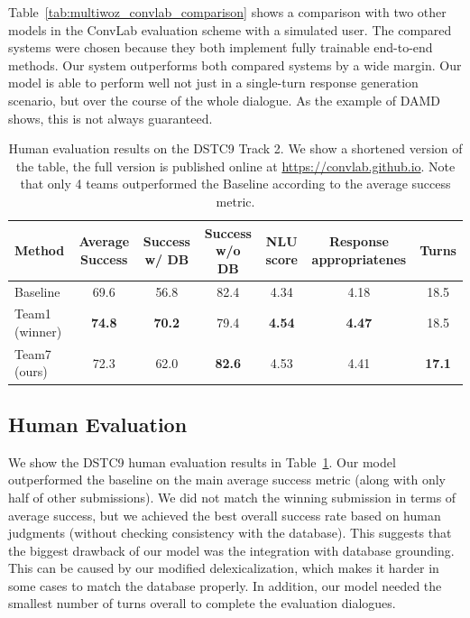 \documentclass[letterpaper]{article} %
\begin{document}
Table~\ref{tab:multiwoz_convlab_comparison} shows a comparison with two other models in the ConvLab evaluation scheme with a simulated user. The compared systems were chosen because they both implement fully trainable end-to-end methods. Our system outperforms both compared systems by a wide margin. Our model is able to perform well not just in a single-turn response generation scenario, but over the course of the whole dialogue. As the example of DAMD shows, this is not always guaranteed.

\begin{table}[ht]
    \centering
    \begin{tabular}{lcccccc}
      \toprule
      Method & Average Success & Success w/ DB & Success w/o DB & NLU score & Response appropriatenes & Turns \\
      \midrule
      Baseline & 69.6 & 56.8 & 82.4 & 4.34 & 4.18 & 18.5 \\
      Team1 (winner) & \textbf{74.8} & \textbf{70.2} & 79.4 & \textbf{4.54 }& \textbf{4.47} & 18.5 \\
      Team7 (ours) & 72.3 & 62.0 & \textbf{82.6} & 4.53 & 4.41 & \textbf{17.1} \\
      \bottomrule
    \end{tabular}
    \caption{Human evaluation results on the DSTC9 Track 2. We show a shortened version of the table, the full version is published online at \url{https://convlab.github.io}. Note that only 4 teams outperformed the Baseline according to the average success metric.}
    \label{tab:human}
\end{table}


\subsection{Human Evaluation}

We show the DSTC9 human evaluation results in Table~\ref{tab:human}.
Our model outperformed the baseline on the main average success metric (along with only half of other submissions).
We did not match the winning submission in terms of average success, but we achieved the best overall success rate based on human judgments (without checking consistency with the database).
This suggests that the biggest drawback of our model was the integration with database grounding.
This can be caused by our modified delexicalization, which makes it harder in some cases to match the database properly.
In addition, our model 
needed the smallest number of turns overall to complete the evaluation dialogues.
\end{document}
